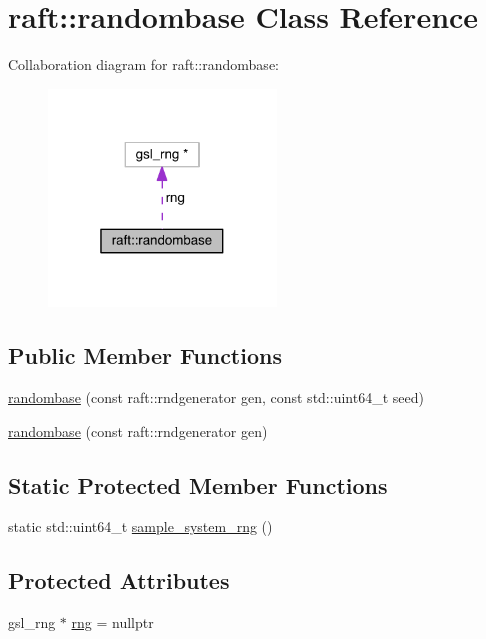 \hypertarget{classraft_1_1randombase}{}\section{raft\+:\+:randombase Class Reference}
\label{classraft_1_1randombase}


Collaboration diagram for raft\+:\+:randombase\+:
\nopagebreak
\begin{figure}[H]
\begin{center}
\leavevmode
\includegraphics[width=172pt]{classraft_1_1randombase__coll__graph}
\end{center}
\end{figure}
\subsection*{Public Member Functions}
\begin{DoxyCompactItemize}
\item 
\hyperlink{classraft_1_1randombase_a52ce4d35a23a557706015dfcda80ea2f}{randombase} (const raft\+::rndgenerator gen, const std\+::uint64\+\_\+t seed)
\item 
\hyperlink{classraft_1_1randombase_a266855acd0445688838787a7c1bcdee7}{randombase} (const raft\+::rndgenerator gen)
\end{DoxyCompactItemize}
\subsection*{Static Protected Member Functions}
\begin{DoxyCompactItemize}
\item 
static std\+::uint64\+\_\+t \hyperlink{classraft_1_1randombase_a50348491bf2bdba0de927582c0fee493}{sample\+\_\+system\+\_\+rng} ()
\end{DoxyCompactItemize}
\subsection*{Protected Attributes}
\begin{DoxyCompactItemize}
\item 
gsl\+\_\+rng $\ast$ \hyperlink{classraft_1_1randombase_a0e76811a01930066c262f9cecfd684b9}{rng} = nullptr
\end{DoxyCompactItemize}


